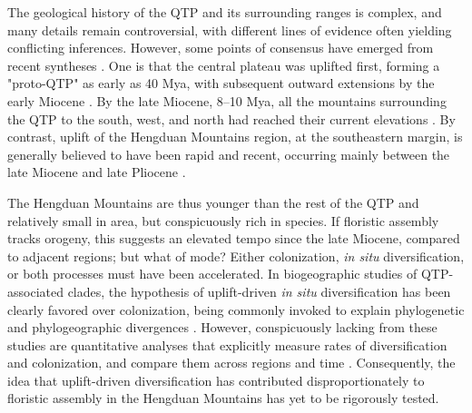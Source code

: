 The geological history of the QTP and its surrounding ranges is
complex, and many details remain controversial, with different lines
of evidence often yielding conflicting inferences. However, some
points of consensus have emerged from recent syntheses
\citep{WangC2014,Favre2015,Deng2015,Renner2016}. One is that the
central plateau was uplifted first, forming a "proto-QTP" as early as
40 Mya, with subsequent outward extensions by the early Miocene
\citep{Rowley2006,WangC2014}. By the late Miocene, 8--10 Mya, all the
mountains surrounding the QTP to the south, west, and north had
reached their current elevations
\citep{Spicer2003,Fang2005,WangY2012,Deng2015}. By contrast, uplift of
the Hengduan Mountains region, at the southeastern margin, is
generally believed to have been rapid and recent, occurring mainly
between the late Miocene and late Pliocene
\citep{kirby2002,clark2005,WangE2012,Wang2014,Meng2016,SunB2011}.%

The Hengduan Mountains are thus younger than the rest of the QTP and
relatively small in area, but conspicuously rich in species. If
floristic assembly tracks orogeny, this suggests an elevated tempo
since the late Miocene, compared to adjacent regions; but what of
mode? Either colonization, \textit{in situ} diversification, or both
processes must have been accelerated. In biogeographic studies of
QTP-associated clades, the hypothesis of uplift-driven \textit{in
  situ} diversification has been clearly favored over colonization,
being commonly invoked to explain phylogenetic and phylogeographic
divergences
\citep[e.g.,][]{LiuJ2006,WangY2009,ZhangJ2014,GaoY2013}. However,
conspicuously lacking from these studies are quantitative analyses
that explicitly measure rates of diversification and colonization, and
compare them across regions and time
\citep{Wen2014,Favre2015}. Consequently, the idea that uplift-driven
diversification has contributed disproportionately to floristic
assembly in the Hengduan Mountains has yet to be rigorously tested.


